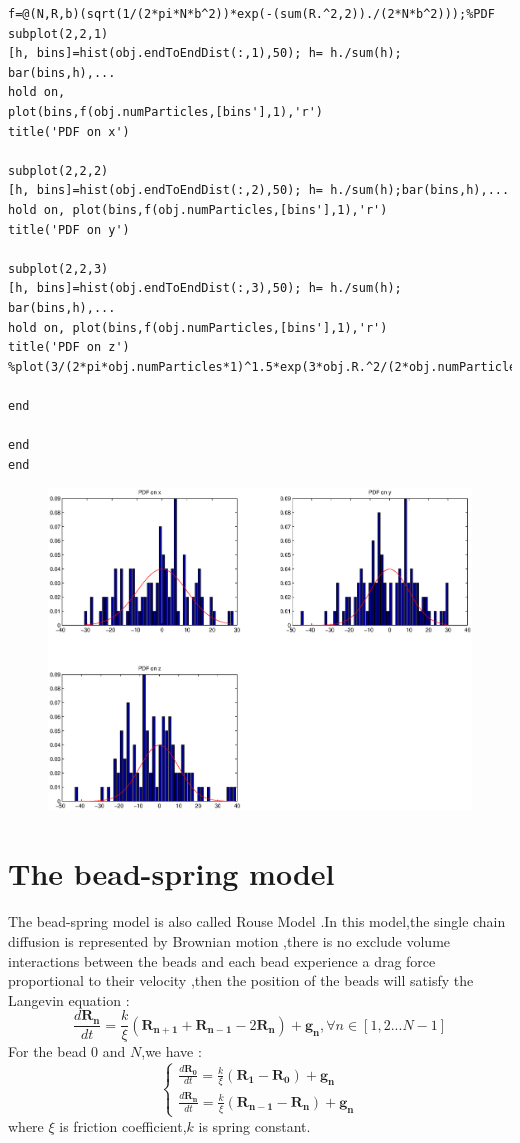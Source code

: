 \documentclass{article}
\begin{document}
\begin{lstlisting}
f=@(N,R,b)(sqrt(1/(2*pi*N*b^2))*exp(-(sum(R.^2,2))./(2*N*b^2)));%PDF 
subplot(2,2,1)
[h, bins]=hist(obj.endToEndDist(:,1),50); h= h./sum(h); bar(bins,h),...
hold on, 
plot(bins,f(obj.numParticles,[bins'],1),'r')
title('PDF on x')

subplot(2,2,2)
[h, bins]=hist(obj.endToEndDist(:,2),50); h= h./sum(h);bar(bins,h),...
hold on, plot(bins,f(obj.numParticles,[bins'],1),'r')
title('PDF on y')

subplot(2,2,3)
[h, bins]=hist(obj.endToEndDist(:,3),50); h= h./sum(h); bar(bins,h),...
hold on, plot(bins,f(obj.numParticles,[bins'],1),'r')
title('PDF on z')
%plot(3/(2*pi*obj.numParticles*1)^1.5*exp(3*obj.R.^2/(2*obj.numParticles*1)))

end

end
end 

\end{lstlisting}
\begin{figure}[H]
	\includegraphics[width=6.2in]{PDF.eps} 
	 
	 \end{figure}
	 \section{The bead-spring model}
	 \paragraph{}
	 The bead-spring model is also called Rouse Model .In this model,the single chain diffusion is represented by Brownian motion ,there is no exclude volume 	interactions between the beads and each bead experience a drag force proportional to their velocity ,then the position of the beads will satisfy the Langevin equation :
	 \begin{equation}
	 \frac{d\bm{R_n}}{dt}=\frac{k}{\xi}(\bm{R_{n+1}}+\bm{R_{n-1}}-2\bm{R_{n}})+\bm{g_n}, \forall n \in [1,2...N-1]
	 \end{equation}
	 For the bead $0$ and $N$,we have :
	 \[
	 \begin{cases}
	\frac{d\bm{R_0}}{dt}=\frac{k}{\xi}(\bm{R_{1}}-\bm{R_{0}})+\bm{g_n}\\
	\frac{d\bm{R_n}}{dt}=\frac{k}{\xi}(\bm{R_{n-1}}-\bm{R_{n}})+\bm{g_n}
	 \end{cases}
	 \]
	 where $\xi$ is friction coefficient,$k$ is spring constant.
\end{document}
